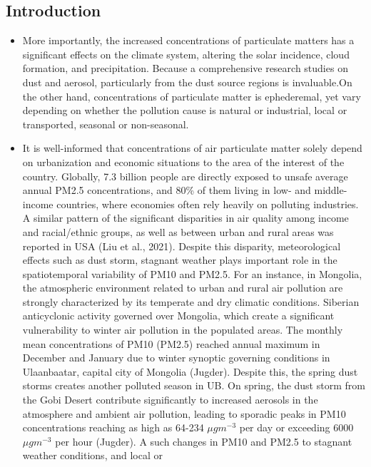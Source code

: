 \documentclass[
  11pt,
]{article}
\begin{document}
\subsection{Introduction}\label{introduction}

\begin{itemize}
\item
  More importantly, the increased concentrations of particulate matters
  has a significant effects on the climate system, altering the solar
  incidence, cloud formation, and precipitation. Because a comprehensive
  research studies on dust and aerosol, particularly from the dust
  source regions is invaluable.On the other hand, concentrations of
  particulate matter is ephederemal, yet vary depending on whether the
  pollution cause is natural or industrial, local or transported,
  seasonal or non-seasonal.
\item
  It is well-informed that concentrations of air particulate matter
  solely depend on urbanization and economic situations to the area of
  the interest of the country. Globally, 7.3 billion people are directly
  exposed to unsafe average annual PM2.5 concentrations, and 80\% of
  them living in low- and middle-income countries, where economies often
  rely heavily on polluting industries. A similar pattern of the
  significant disparities in air quality among income and racial/ethnic
  groups, as well as between urban and rural areas was reported in USA
  (Liu et al., 2021). Despite this disparity, meteorological effects
  such as dust storm, stagnant weather plays important role in the
  spatiotemporal variability of PM10 and PM2.5. For an instance, in
  Mongolia, the atmospheric environment related to urban and rural air
  pollution are strongly characterized by its temperate and dry climatic
  conditions. Siberian anticyclonic activity governed over Mongolia,
  which create a significant vulnerability to winter air pollution in
  the populated areas. The monthly mean concentrations of PM10 (PM2.5)
  reached annual maximum in December and January due to winter synoptic
  governing conditions in Ulaanbaatar, capital city of Mongolia
  (Jugder). Despite this, the spring dust storms creates another
  polluted season in UB. On spring, the dust storm from the Gobi Desert
  contribute significantly to increased aerosols in the atmosphere and
  ambient air pollution, leading to sporadic peaks in PM10
  concentrations reaching as high as 64-234 \(\mu g m^{-3}\) per day or
  exceeding 6000 \(\mu g m^{-3}\) per hour (Jugder). A such changes in
  PM10 and PM2.5 to stagnant weather conditions, and local or

\end{itemize}
\end{document}
